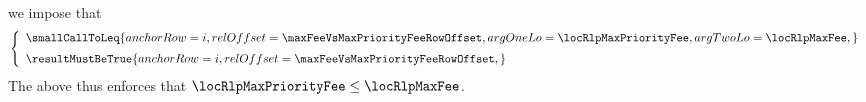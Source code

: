 \item[\underline{\underline{Row n$°(i + \maxFeeVsMaxPriorityFeeRowOffset)$: comparing \locRlpMaxFee{} and \locRlpMaxPriorityFee{}:}}]
	we impose that
	\[
		\left\{ \begin{array}{l}
			\smallCallToLeq {
				anchorRow = i                                ,
				relOffset = \maxFeeVsMaxPriorityFeeRowOffset ,
				argOneLo  = \locRlpMaxPriorityFee            ,
				argTwoLo  = \locRlpMaxFee                    ,
			}
			\vspace{2mm}
			\\
			\resultMustBeTrue {
				anchorRow = i                                ,
				relOffset = \maxFeeVsMaxPriorityFeeRowOffset ,
			}
			\\
		\end{array} \right.
	\]
	\saNote{}
	The above thus enforces that
	$\locRlpMaxPriorityFee \leq \locRlpMaxFee$.
